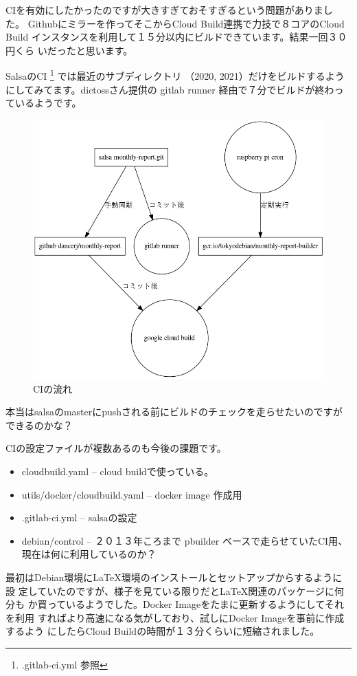 \documentclass[mingoth,a4paper]{jsarticle}
\begin{document}
CIを有効にしたかったのですが大きすぎておそすぎるという問題がありました。
Githubにミラーを作ってそこからCloud Build連携で力技で８コアのCloud Build
インスタンスを利用して１５分以内にビルドできています。結果一回３０円くら
いだったと思います。

SalsaのCI \footnote{.gitlab-ci.yml 参照} では最近のサブディレクトリ
（2020, 2021）だけをビルドするようにしてみてます。dictossさん提供の
gitlab runner 経由で７分でビルドが終わっているようです。

\begin{figure}[h]
\begin{center}
\includegraphics[keepaspectratio,width=0.5\hsize]{image202011/debci.png}
\end{center}
\caption{CIの流れ}
\label{fig:monthlyreport-ci-configuration}
\end{figure}

本当はsalsaのmasterにpushされる前にビルドのチェックを走らせたいのですが
できるのかな？

CIの設定ファイルが複数あるのも今後の課題です。

\begin{itemize}
 \item cloudbuild.yaml -- cloud buildで使っている。
 \item utils/docker/cloudbuild.yaml -- docker image 作成用
 \item .gitlab-ci.yml -- salsaの設定
 \item debian/control -- ２０１３年ころまで pbuilder ベースで走らせていたCI用、現在は何に利用しているのか？
\end{itemize}

最初はDebian環境にLaTeX環境のインストールとセットアップからするように設
定していたのですが、様子を見ている限りだとLaTeX関連のパッケージに何分も
か買っているようでした。Docker Imageをたまに更新するようにしてそれを利用
すればより高速になる気がしており、試しにDocker Imageを事前に作成するよう
にしたらCloud Buildの時間が１３分くらいに短縮されました。
\end{document}
